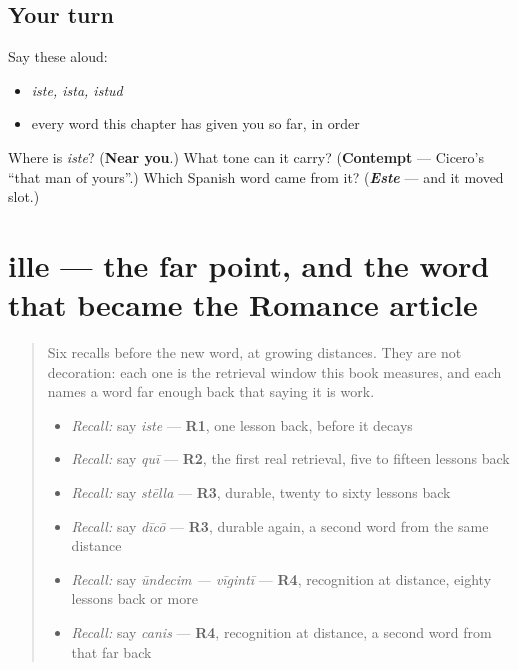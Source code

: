 \subsection*{Your turn}
Say these aloud:

\begin{itemize}
\raggedright
  \item \emph{iste, ista, istud}
  \item every word this chapter has given you so far, in order
\end{itemize}

\begin{tcolorbox}[breakable,colback=teal!4,colframe=teal!35!black,title={Before you move on}]
Where is \emph{iste}? (\textbf{Near you}.) What tone can it carry? (\textbf{Contempt} — Cicero's \textquotedblleft{}that man of yours\textquotedblright{}.) Which Spanish word came from it? (\emph{\textbf{Este}} — and it moved slot.)
\end{tcolorbox}
\section[ille, illa, illud]{ille — the far point, and the word that became the Romance article}

\label{lesson:LA-C50-ille}



\begin{quote}
Six recalls before the new word, at growing distances. They are not decoration: each one is the retrieval window this book measures, and each names a word far enough back that saying it is work.

\begin{itemize}
\raggedright
  \item \emph{Recall:} say \emph{iste} — \textbf{R1}, one lesson back, before it decays
  \item \emph{Recall:} say \emph{quī} — \textbf{R2}, the first real retrieval, five to fifteen lessons back
  \item \emph{Recall:} say \emph{stēlla} — \textbf{R3}, durable, twenty to sixty lessons back
  \item \emph{Recall:} say \emph{dīcō} — \textbf{R3}, durable again, a second word from the same distance
  \item \emph{Recall:} say \emph{ūndecim — vīgintī} — \textbf{R4}, recognition at distance, eighty lessons back or more
  \item \emph{Recall:} say \emph{canis} — \textbf{R4}, recognition at distance, a second word from that far back
\end{itemize}
\end{quote}

